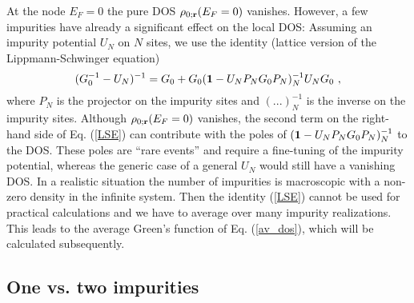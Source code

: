 \documentclass[aps]{revtex4}
\def\beq{\begin{equation}}
\def\eeq{\end{equation}}
\def\br{{\bf r}}
\begin{document}
At the node $E_F=0$ the pure DOS $\rho_{0;\br}(E_F=0)$ vanishes. However,
a few impurities have already a significant effect on the local DOS: %
Assuming an impurity potential $U_N$ on $N$ sites, we use the identity (lattice version of the 
Lippmann-Schwinger equation) 
\beq
(G_0^{-1}-U_N)^{-1}=G_0 + G_0({\bf 1} - U_N P_NG_0P_N)^{-1}_NU_N G_0
\ ,
\label{LSE}
\eeq
where $P_N$ is the projector on the impurity sites and $(...)^{-1}_N$ is the inverse 
on the impurity sites. Although $\rho_{0;\br}(E_F=0)$ vanishes,
the second term on the right-hand side of Eq. (\ref{LSE}) can contribute with the poles of 
$({\bf 1} - U_N P_NG_0P_N)^{-1}_N$
to the DOS. These poles are ``rare events'' and require a fine-tuning of the impurity potential, 
whereas the generic case of a general $U_N$ would still have a vanishing DOS. In a realistic situation
the number of impurities is macroscopic with a non-zero density in the infinite system. Then
the identity (\ref{LSE}) cannot be used for practical calculations and we have to average over 
many impurity realizations.
This leads to the average Green's function of Eq. (\ref{av_dos}), which will be calculated subsequently.


\subsection{One vs. two impurities}
\end{document}

